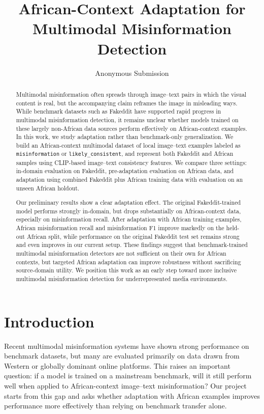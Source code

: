 \documentclass{article}
\title{African-Context Adaptation for Multimodal Misinformation Detection}
\author{Anonymous Submission}
\begin{document}
\maketitle

\begin{abstract}
Multimodal misinformation often spreads through image--text pairs in which the visual content is real, but the accompanying claim reframes the image in misleading ways. While benchmark datasets such as Fakeddit have supported rapid progress in multimodal misinformation detection, it remains unclear whether models trained on these largely non-African data sources perform effectively on African-context examples. In this work, we study adaptation rather than benchmark-only generalization. We build an African-context multimodal dataset of local image--text examples labeled as \texttt{misinformation} or \texttt{likely\_consistent}, and represent both Fakeddit and African samples using CLIP-based image--text consistency features. We compare three settings: in-domain evaluation on Fakeddit, pre-adaptation evaluation on African data, and adaptation using combined Fakeddit plus African training data with evaluation on an unseen African holdout.

Our preliminary results show a clear adaptation effect. The original Fakeddit-trained model performs strongly in-domain, but drops substantially on African-context data, especially on misinformation recall. After adaptation with African training examples, African misinformation recall and misinformation F1 improve markedly on the held-out African split, while performance on the original Fakeddit test set remains strong and even improves in our current setup. These findings suggest that benchmark-trained multimodal misinformation detectors are not sufficient on their own for African contexts, but targeted African adaptation can improve robustness without sacrificing source-domain utility. We position this work as an early step toward more inclusive multimodal misinformation detection for underrepresented media environments.
\end{abstract}

\section{Introduction}
Recent multimodal misinformation systems have shown strong performance on benchmark datasets, but many are evaluated primarily on data drawn from Western or globally dominant online platforms. This raises an important question: if a model is trained on a mainstream benchmark, will it still perform well when applied to African-context image--text misinformation? Our project starts from this gap and asks whether adaptation with African examples improves performance more effectively than relying on benchmark transfer alone.
\end{document}
